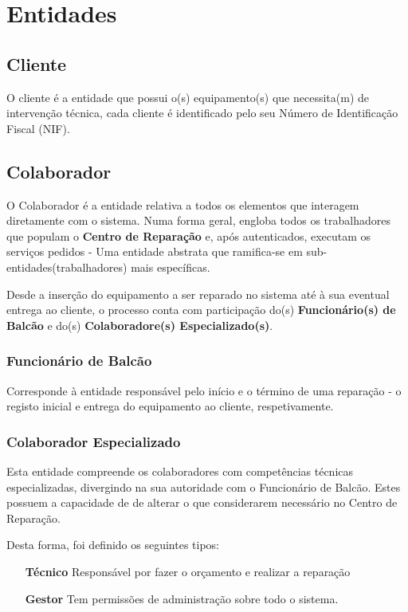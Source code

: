 \documentclass[a4paper,12pt]{scrreprt}
\begin{document}
\section{Entidades}

\subsection{Cliente}\label{ent_cliente}
O cliente é a entidade que possui o(s) equipamento(s) que necessita(m) de intervenção técnica, cada cliente é identificado pelo 
seu Número de Identificação Fiscal (NIF).

\subsection{Colaborador} \label{ent_colaborador}
O Colaborador é a entidade relativa a todos os elementos que interagem diretamente com o sistema. 
Numa forma geral, engloba todos os trabalhadores que populam o \textbf{Centro de Reparação} e, após autenticados, executam os
 serviços pedidos - Uma entidade abstrata que ramifica-se em sub-entidades(trabalhadores) mais específicas.

Desde a inserção do equipamento a ser reparado no sistema até à sua eventual entrega ao cliente, o processo conta com participação
 do(s) \textbf{Funcionário(s) de Balcão} e do(s) \textbf{Colaboradore(s) Especializado(s)}.

\subsubsection{Funcionário de Balcão} \label{ent_func_balcao}
Corresponde à entidade responsável pelo início e o término de uma reparação - o registo inicial e entrega do equipamento ao cliente, respetivamente.  

\subsubsection{Colaborador Especializado} \label{ent_colab_especializado}
Esta entidade compreende os colaboradores com competências técnicas especializadas, divergindo na sua autoridade com o Funcionário de Balcão. 
Estes possuem a capacidade de de alterar o que considerarem necessário no Centro de Reparação.

Desta forma, foi definido os seguintes tipos:
\begin{itemize}
    \item[\textbf{Técnico}]{Responsável por fazer o orçamento e realizar a reparação} 
    \item[\textbf{Gestor}]{Tem permissões de administração sobre todo o sistema.}
\end{itemize}
\end{document}
